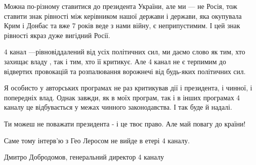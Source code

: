 Можна по-різному ставитися до президента України, але ми — не Росія, тож
ставити знак рівності між керівником нашої держави і держави, яка окупувала
Крим і Донбас та вже 7 років веде з нами війну, є неприпустимим. І цей знак
рівності якраз дуже вигідний Росії. 

4 канал —рівновіддалений від усіх політичних сил, ми  даємо слово як тим, хто
захищає владу , так і тим, хто її критикує. Але 4 канал не є терпимим до
відвертих провокацій та розпалювання ворожнечі від будь-яких політичних сил. 

Я особисто у авторських програмах не раз критикував дії і президента, і чинної,
і попередніх влад. Однак завжди, як в моїх програм, так і в інших програмах 4
каналу це відбувається у межах чинного законодавства. І так буде й надалі. 

Ти можеш не поважати президента - і це твоє право. Але май повагу до країни!

Саме тому інтерв'ю з Гео Леросом не вийде в етері 4 каналу.

Дмитро Добродомов, генеральний директор 4 каналу
